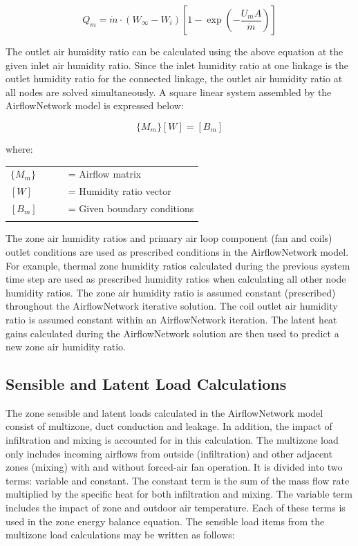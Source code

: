 \begin{equation}
Q_m = \dot{m} \cdot (W_\infty - W_i)\left[ 1 - \exp \left(- \frac{U_m A}{\dot{m}} \right) \right]
\end{equation}

The outlet air humidity ratio can be calculated using the above equation at the given inlet air humidity ratio. Since the inlet humidity ratio at one linkage is the outlet humidity ratio for the connected linkage, the outlet air humidity ratio at all nodes are solved simultaneously. A square linear system assembled by the AirflowNetwork model is expressed below:

\begin{equation}
\{M_m\} [W] = [B_m]
\end{equation}

where:

\begin{tabular}{lp{0.7\linewidth}}
\\
$\{M_m\}$ &= Airflow matrix\\
$[W]$ &= Humidity ratio vector\\
$[B_m]$ &= Given boundary conditions\\
\\
\end{tabular}

The zone air humidity ratios and primary air loop component (fan and coils) outlet conditions are used as prescribed conditions in the AirflowNetwork model. For example, thermal zone humidity ratios calculated during the previous system time step are used as prescribed humidity ratios when calculating all other node humidity ratios. The zone air humidity ratio is assumed constant (prescribed) throughout the AirflowNetwork iterative solution. The coil outlet air humidity ratio is assumed constant within an AirflowNetwork iteration. The latent heat gains calculated during the AirflowNetwork solution are then used to predict a new zone air humidity ratio.

\subsection{Sensible and Latent Load Calculations}\label{sensible-and-latent-load-calculations}

The zone sensible and latent loads calculated in the AirflowNetwork model consist of multizone, duct conduction and leakage. In addition, the impact of infiltration and mixing is accounted for in this calculation. The multizone load only includes incoming airflows from outside (infiltration) and other adjacent zones (mixing) with and without forced-air fan operation. It is divided into two terms: variable and constant. The constant term is the sum of the mass flow rate multiplied by the specific heat for both infiltration and mixing. The variable term includes the impact of zone and outdoor air temperature. Each of these terms is used in the zone energy balance equation. The sensible load items from the multizone load calculations may be written as follows:

